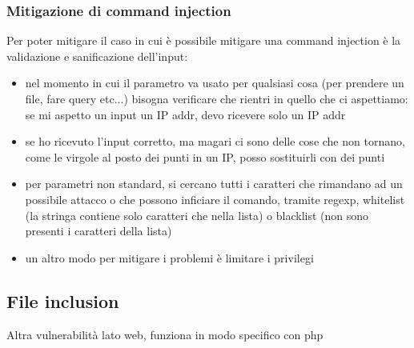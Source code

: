\documentclass{article}
\begin{document}
\subsubsection{Mitigazione di command injection}
Per poter mitigare il caso in cui è possibile mitigare una command injection è la validazione e sanificazione dell'input:
\begin{itemize}
\item nel momento in cui il parametro va usato per qualsiasi cosa (per prendere un file, fare query etc...) bisogna verificare che rientri in quello che ci aspettiamo: se mi aspetto un input un IP addr, devo ricevere solo un IP addr
\item se ho ricevuto l'input corretto, ma magari ci sono delle cose che non tornano, come le virgole al posto dei punti in un IP, posso sostituirli con dei punti
\item per parametri non standard, si cercano tutti i caratteri che rimandano ad un possibile attacco o che possono inficiare il comando, tramite regexp, whitelist (la stringa contiene solo caratteri che nella lista) o blacklist (non sono presenti i caratteri della lista)
\item un altro modo per mitigare i problemi è limitare i privilegi
\end{itemize}
\subsection{File inclusion}
Altra vulnerabilità lato web, funziona in modo specifico con php
\end{document}
